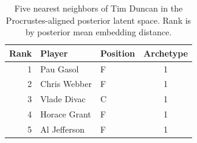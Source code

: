 \begin{table}[htbp]
  \centering\small
  \begin{tabular}{rllc}
    \toprule
    Rank & Player & Position & Archetype \\
    \midrule
    1 & Pau Gasol & F & 1 \\
    2 & Chris Webber & F & 1 \\
    3 & Vlade Divac & C & 1 \\
    4 & Horace Grant & F & 1 \\
    5 & Al Jefferson & F & 1 \\
    \bottomrule
  \end{tabular}
  \caption{Five nearest neighbors of Tim Duncan in the Procrustes-aligned posterior latent space. Rank is by posterior mean embedding distance.}
  \label{tab:Tim_Duncan_neighbors}
\end{table}

